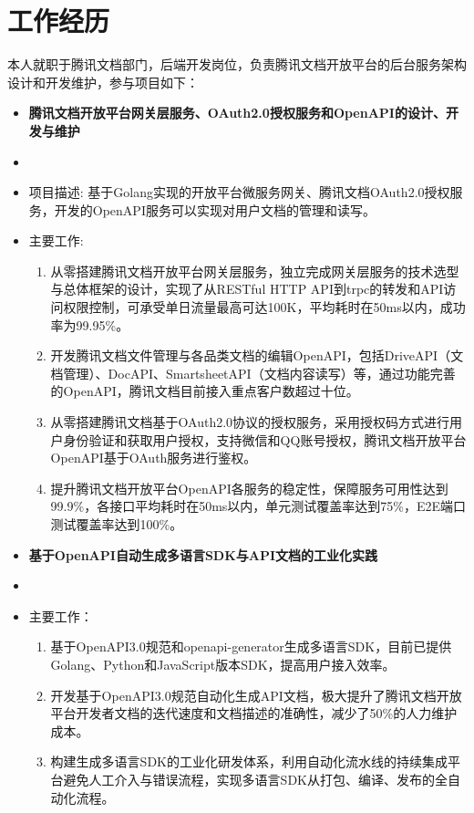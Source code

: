 \documentclass{resume}
\begin{document}
\section{工作经历}
\begin{onehalfspacing}
本人就职于腾讯文档部门，后端开发岗位，负责腾讯文档开放平台的后台服务架构设计和开发维护，参与项目如下：
\begin{itemize}
  \item \textbf{腾讯文档开放平台网关层服务、OAuth2.0授权服务和OpenAPI的设计、开发与维护}
  \item {}
  \item 项目描述: 基于Golang实现的开放平台微服务网关、腾讯文档OAuth2.0授权服务，开发的OpenAPI服务可以实现对用户文档的管理和读写。
  \item 主要工作: 
\begin{enumerate}
  \item 从零搭建腾讯文档开放平台网关层服务，独立完成网关层服务的技术选型与总体框架的设计，实现了从RESTful HTTP API到trpc的转发和API访问权限控制，可承受单日流量最高可达100K，平均耗时在50ms以内，成功率为99.95\%。
  \item 开发腾讯文档文件管理与各品类文档的编辑OpenAPI，包括DriveAPI（文档管理）、DocAPI、SmartsheetAPI（文档内容读写）等，通过功能完善的OpenAPI，腾讯文档目前接入重点客户数超过十位。
  \item 从零搭建腾讯文档基于OAuth2.0协议的授权服务，采用授权码方式进行用户身份验证和获取用户授权，支持微信和QQ账号授权，腾讯文档开放平台OpenAPI基于OAuth服务进行鉴权。
  \item 提升腾讯文档开放平台OpenAPI各服务的稳定性，保障服务可用性达到99.9\%，各接口平均耗时在50ms以内，单元测试覆盖率达到75\%，E2E端口测试覆盖率达到100\%。
\end{enumerate}
\end{itemize}
\begin{itemize}
  \item \textbf{基于OpenAPI自动生成多语言SDK与API文档的工业化实践}
  \item {}
  \item 主要工作：
\begin{enumerate}
  \item 基于OpenAPI3.0规范和openapi-generator生成多语言SDK，目前已提供Golang、Python和JavaScript版本SDK，提高用户接入效率。
  \item 开发基于OpenAPI3.0规范自动化生成API文档，极大提升了腾讯文档开放平台开发者文档的迭代速度和文档描述的准确性，减少了50\%的人力维护成本。
  \item 构建生成多语言SDK的工业化研发体系，利用自动化流水线的持续集成平台避免人工介入与错误流程，实现多语言SDK从打包、编译、发布的全自动化流程。
\end{enumerate}
\end{itemize}
\end{onehalfspacing}
\end{document}
